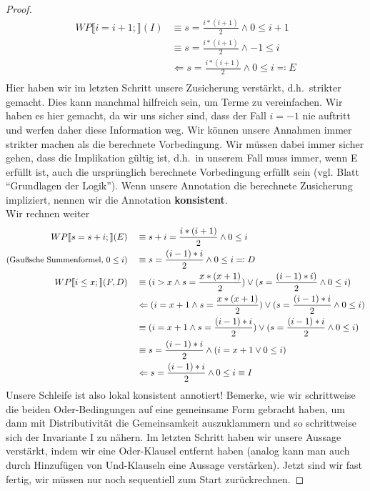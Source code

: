 \documentclass[hidelinks]{article}
\theoremstyle{plain}
\theoremstyle{definition}
\theoremstyle{rem}
\begin{document}
\begin{sloppypar}
\begin{proof}
\begin{align*}
WP\llbracket i=i+1;\rrbracket(I)&\equiv s=\frac{i*(i+1)}{2}\wedge 0\le i+1\\
&\equiv s=\frac{i*(i+1)}{2}\wedge -1\le i\\
&\Leftarrow s=\frac{i*(i+1)}{2}\wedge 0\le i \eqqcolon E\\
\end{align*}
Hier haben wir im letzten Schritt unsere Zusicherung verstärkt, d.h.\ strikter gemacht. Dies kann manchmal hilfreich sein, um Terme zu vereinfachen. Wir haben es hier gemacht, da wir uns sicher sind, dass der Fall $i=-1$ nie auftritt und werfen daher diese Information weg. Wir können unsere Annahmen immer strikter machen als die berechnete Vorbedingung. Wir müssen dabei immer sicher gehen, dass die Implikation gültig ist, d.h.\ in unserem Fall muss immer, wenn E erfüllt ist, auch die ursprünglich berechnete Vorbedingung erfüllt sein (vgl. Blatt ``Grundlagen der Logik''). Wenn unsere Annotation die berechnete Zusicherung impliziert, nennen wir die Annotation \textbf{konsistent}.\\
Wir rechnen weiter
\begin{align*}
WP\llbracket s=s+i;\rrbracket(E)\quad&\equiv s+i=\frac{i*(i+1)}{2}\wedge 0\le i\\
\text{\small{(Gaußsche Summenformel, $0\le i$)}}\quad&\equiv s=\frac{(i-1)*i}{2}\wedge 0\le i\eqqcolon D\\
WP\llbracket i\le x;\rrbracket(F,D)\quad&\equiv (i>x \wedge s=\frac{x*(x+1)}{2})\vee (s=\frac{(i-1)*i)}{2}\wedge 0\le i)\\
&\Leftarrow (i=x+1 \wedge s=\frac{x*(x+1)}{2})\vee (s=\frac{(i-1)*i}{2}\wedge 0\le i)\\
&\equiv (i=x+1 \wedge s=\frac{(i-1)*i}{2})\vee (s=\frac{(i-1)*i}{2}\wedge 0\le i)\\
&\equiv s=\frac{(i-1)*i}{2}\wedge(i=x+1 \vee 0\le i)\\
&\Leftarrow s=\frac{(i-1)*i}{2}\wedge 0\le i\equiv I
\end{align*}
Unsere Schleife ist also lokal konsistent annotiert! Bemerke, wie wir schrittweise die beiden Oder-Bedingungen auf eine gemeinsame Form gebracht haben, um dann mit Distributivität die Gemeinsamkeit auszuklammern und so schrittweise sich der Invariante I zu nähern.
Im letzten Schritt haben wir unsere Aussage verstärkt, indem wir eine Oder-Klausel entfernt haben (analog kann man auch durch Hinzufügen von Und-Klauseln eine Aussage verstärken). Jetzt sind wir fast fertig, wir müssen nur noch sequentiell zum Start zurückrechnen.

\end{proof}
\end{sloppypar}
\end{document}
